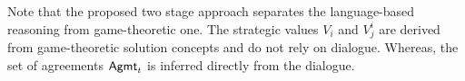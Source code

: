 Note that the proposed two stage approach separates the language-based reasoning from game-theoretic one.
The strategic values $V_i$ and $V_j^i$ are derived from game-theoretic solution concepts and do not rely on dialogue. 
Whereas, the set of agreements $\mathsf{Agmt}_t$ is inferred directly from the dialogue.




%
%

